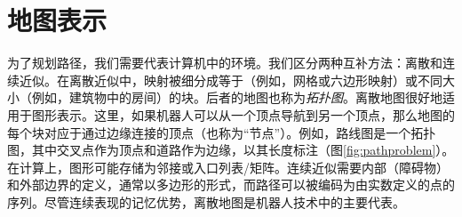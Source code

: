 \section{地图表示}
\label{sec:maps}


为了规划路径，我们需要代表计算机中的环境。我们区分两种互补方法：离散和连续近似。在离散近似中，映射被细分成等于（例如，网格或六边形映射）或不同大小（例如，建筑物中的房间）的块。后者的地图也称为\emph{拓扑图}。离散地图很好地适用于图形表示。这里，如果机器人可以从一个顶点导航到另一个顶点，那么地图的每个块对应于通过边缘连接的顶点（也称为“节点”）。例如，路线图是一个拓扑图，其中交叉点作为顶点和道路作为边缘，以其长度标注（图\ref{fig:pathproblem}）。在计算上，图形可能存储为邻接或入口列表/矩阵。连续近似需要内部（障碍物）和外部边界的定义，通常以多边形的形式，而路径可以被编码为由实数定义的点的序列。尽管连续表现的记忆优势，离散地图是机器人技术中的主要代表。

